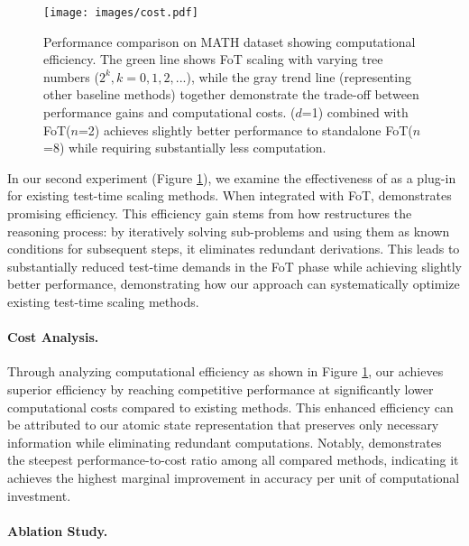 \begin{figure}[ht]
    \centering
    \texttt{[image: images/cost.pdf]}
    \caption{Performance comparison on MATH dataset showing computational efficiency. The green line shows FoT scaling with varying tree numbers ($2^k, k=0,1,2,...$), while the gray trend line (representing other baseline methods) together demonstrate the trade-off between performance gains and computational costs. \our($d$=1) combined with FoT($n$=2) achieves slightly better performance to standalone FoT($n$=8) while requiring substantially less computation.}
    \label{fig:cost}
\end{figure}

\noindent
In our second experiment (Figure \ref{fig:cost}), we examine the effectiveness of \our as a plug-in for existing test-time scaling methods. When integrated with FoT, \our demonstrates promising efficiency. This efficiency gain stems from how \our restructures the reasoning process: by iteratively solving sub-problems and using them as known conditions for subsequent steps, it eliminates redundant derivations. This leads to substantially reduced test-time demands in the FoT phase while achieving slightly better performance, demonstrating how our approach can systematically optimize existing test-time scaling methods.

\paragraph{Cost Analysis.}
Through analyzing computational efficiency as shown in Figure \ref{fig:cost}, our \our achieves superior efficiency by reaching competitive performance at significantly lower computational costs compared to existing methods. This enhanced efficiency can be attributed to our atomic state representation that preserves only necessary information while eliminating redundant computations. Notably, \our demonstrates the steepest performance-to-cost ratio among all compared methods, indicating it achieves the highest marginal improvement in accuracy per unit of computational investment.

\paragraph{Ablation Study.}


